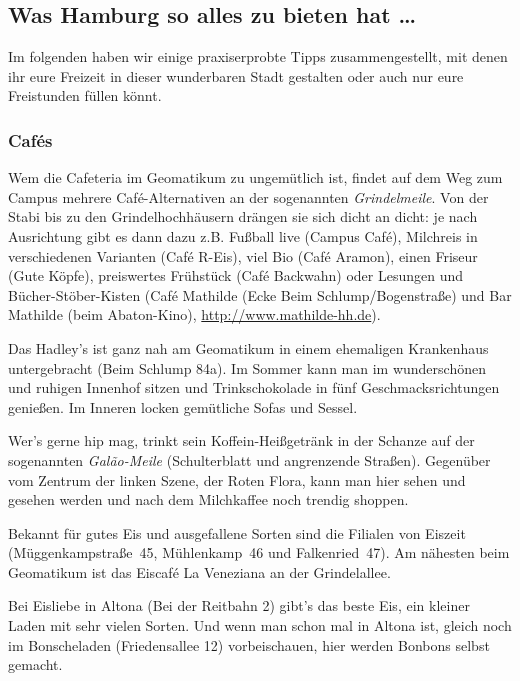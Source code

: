 \subsection{Was Hamburg so alles zu bieten hat \dots}

Im folgenden haben wir einige praxiserprobte Tipps zusammengestellt, mit denen
ihr eure Freizeit in dieser wunderbaren Stadt gestalten oder auch nur eure
Freistunden füllen könnt.

\subsubsection{Caf\'es}


Wem die Cafeteria im Geomatikum zu ungemütlich ist, findet auf dem Weg zum
Campus mehrere Caf\'e-Alternativen an der sogenannten \emph{Grindelmeile}.  Von
der Stabi bis zu den Grindelhochhäusern drängen sie sich dicht an dicht: je
nach Ausrichtung gibt es dann dazu z.B. Fußball live (Campus Caf\'e), Milchreis
in verschiedenen Varianten (Caf\'e R-Eis), viel Bio (Caf\'e Aramon), einen
Friseur (Gute Köpfe), preiswertes Frühstück (Caf\'e Backwahn) oder Lesungen und
Bücher-Stöber-Kisten (Caf\'e Mathilde (Ecke Beim Schlump/Bogenstraße) und Bar
Mathilde (beim Abaton-Kino), \url{http://www.mathilde-hh.de}).

\begin{advice}
Das Hadley's ist ganz nah am Geomatikum in einem ehemaligen Krankenhaus
untergebracht (Beim Schlump 84a). Im Sommer kann man im wunderschönen und
ruhigen Innenhof sitzen und Trinkschokolade in fünf Geschmacksrichtungen
genießen. Im Inneren locken gemütliche Sofas und Sessel.
\end{advice}

Wer's gerne hip mag, trinkt sein Koffein-Heißgetränk in der Schanze auf der
sogenannten \emph{Gal\~{a}o-Meile} (Schulterblatt und angrenzende Straßen).
Gegenüber vom Zentrum der linken Szene, der Roten Flora, kann man hier sehen
und gesehen werden und nach dem Milchkaffee noch trendig shoppen.

Bekannt für gutes Eis und ausgefallene Sorten sind die Filialen von Eiszeit
(Müggenkampstraße~45, Mühlenkamp~46 und Falkenried~47). Am nähesten beim
Geomatikum ist das Eiscaf\'e La Veneziana an der Grindelallee.

\begin{advice}
Bei Eisliebe in Altona (Bei der Reitbahn 2) gibt's das beste Eis, ein kleiner
Laden mit sehr vielen Sorten. Und wenn man schon mal in Altona ist, gleich noch
im Bonscheladen (Friedensallee 12) vorbeischauen, hier werden Bonbons selbst
gemacht.
\end{advice}

